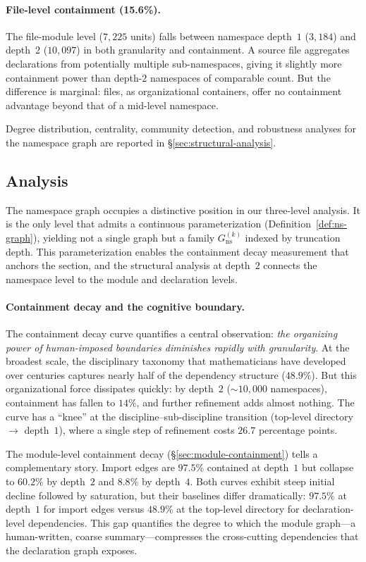 \paragraph{File-level containment (15.6\%).} The file-module level ($7{,}225$ units) falls between namespace depth~$1$ ($3{,}184$) and depth~$2$ ($10{,}097$) in both granularity and containment. A source file aggregates declarations from potentially multiple sub-namespaces, giving it slightly more containment power than depth-$2$ namespaces of comparable count. But the difference is marginal: files, as organizational containers, offer no containment advantage beyond that of a mid-level namespace.

Degree distribution, centrality, community detection, and robustness analyses for the namespace graph are reported in \S\ref{sec:structural-analysis}.

\subsection{Analysis}
\label{sec:ns-analysis}

The namespace graph occupies a distinctive position in our three-level analysis. It is the only level that admits a continuous parameterization (Definition~\ref{def:ns-graph}), yielding not a single graph but a family $G_{\mathrm{ns}}^{(k)}$ indexed by truncation depth. This parameterization enables the containment decay measurement that anchors the section, and the structural analysis at depth~$2$ connects the namespace level to the module and declaration levels.

\paragraph{Containment decay and the cognitive boundary.} The containment decay curve quantifies a central observation: \emph{the organizing power of human-imposed boundaries diminishes rapidly with granularity}. At the broadest scale, the disciplinary taxonomy that mathematicians have developed over centuries captures nearly half of the dependency structure ($48.9\%$). But this organizational force dissipates quickly: by depth~$2$ (${\sim}10{,}000$ namespaces), containment has fallen to $14\%$, and further refinement adds almost nothing. The curve has a ``knee'' at the discipline--sub-discipline transition (top-level directory $\to$ depth~$1$), where a single step of refinement costs $26.7$ percentage points.

The module-level containment decay (\S\ref{sec:module-containment}) tells a complementary story. Import edges are $97.5\%$ contained at depth~$1$ but collapse to $60.2\%$ by depth~$2$ and $8.8\%$ by depth~$4$. Both curves exhibit steep initial decline followed by saturation, but their baselines differ dramatically: $97.5\%$ at depth~$1$ for import edges versus $48.9\%$ at the top-level directory for declaration-level dependencies. This gap quantifies the degree to which the module graph---a human-written, coarse summary---compresses the cross-cutting dependencies that the declaration graph exposes.

